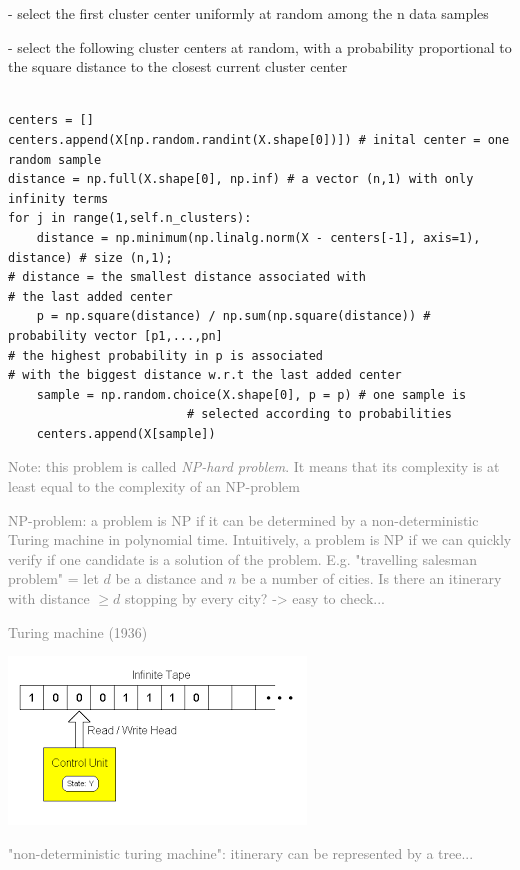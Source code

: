- select the first cluster center uniformly at random among the n data samples

- select the following cluster centers at random, with a probability proportional to the square distance to the closest current cluster center

\lstset{language=Python}
\lstset{frame=lines}
\lstset{basicstyle=\footnotesize}
\begin{lstlisting}

centers = []
centers.append(X[np.random.randint(X.shape[0])]) # inital center = one random sample
distance = np.full(X.shape[0], np.inf) # a vector (n,1) with only infinity terms
for j in range(1,self.n_clusters):
    distance = np.minimum(np.linalg.norm(X - centers[-1], axis=1), distance) # size (n,1); 
# distance = the smallest distance associated with 
# the last added center
    p = np.square(distance) / np.sum(np.square(distance)) # probability vector [p1,...,pn]
# the highest probability in p is associated 
# with the biggest distance w.r.t the last added center
    sample = np.random.choice(X.shape[0], p = p) # one sample is 
						 # selected according to probabilities
    centers.append(X[sample])

\end{lstlisting}

\textcolor{gray}{Note: this problem is called \textit{NP-hard problem}. It means that its complexity is at least equal to the complexity of an NP-problem}

\textcolor{gray}{NP-problem: a problem is NP if it can be determined by a non-deterministic Turing machine in polynomial time. Intuitively, a problem is NP if we can quickly verify if one candidate is a solution of the problem. E.g. "travelling salesman problem" = let $d$ be a distance and $n$ be a number of cities. Is there an itinerary with distance $\ge d$ stopping by every city? -> easy to check...}

\vspace{5mm}
\textcolor{gray}{Turing machine (1936)}

\includegraphics{turingmachine.png}

\textcolor{gray}{"non-deterministic turing machine": itinerary can be represented by a tree...}

\vspace{5mm}

